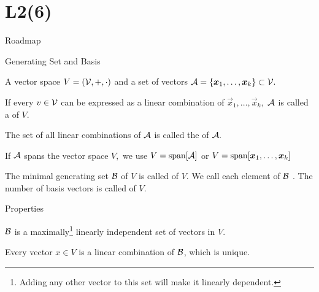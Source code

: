 \documentclass[fleqn,aspectratio=169]{beamer}
\begin{document}
\section{L2(6)}
\begin{frame}{Roadmap}

\plitemsep 0.1in

\bce[(1)] 
\item {}

\item {}

\item {}
\ece
\end{frame}


\begin{frame}{Generating Set and Basis}

\plitemsep 0.1in

\bci 
\item {} A vector space $V=(\mathcal V, +, \cdot)$ and a set of vectors $\mathcal A = \{\bm{x}_1, \ldots, \bm{x}_k \} \subset \mathcal V.$
\vspace{-0.3cm}
\bci
\item If every $v \in \mathcal V$ can be expressed as a linear combination of $\vec{x}_1, \ldots, \vec{x}_k,$ $\mathcal A$ is called a  of $V.$
\item The set of all linear combinations of $\mathcal A$ is called the  of $\mathcal A.$
\item If $\mathcal A$ spans the vector space $V,$ we use $V = \text{span}[\mathcal A]$ or $V = \text{span}[\bm{x}_1, \ldots, \bm{x}_k]$
\eci

\item {} The minimal generating set $\mathcal B$ of $V$ is called  of $V.$ We call each element of $\mathcal B$ . The number of basis vectors is called  of $V.$

\item Properties
\bci
\item $\mathcal B$ is a maximally\footnote{Adding any other vector to this set will make it linearly dependent.} linearly independent set of vectors in $V.$
\item Every vector $x \in V$ is a linear combination of $\mathcal B$, which is unique. 
\eci
\eci

\end{frame}
\end{document}
